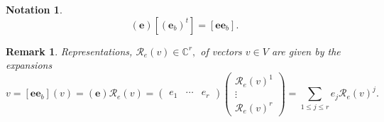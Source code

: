 \documentclass[aps,preprint]{revtex4}
\newtheorem{notation}[theorem]{Notation}
\newtheorem{remark}[theorem]{Remark}
\begin{document}
\begin{notation}
\begin{equation}
\left( \boldsymbol{e}\right) \left[ \left( \boldsymbol{e}_{b}\right) ^{t}%
\right] =\left[ \boldsymbol{ee}_{b}\right] .
\end{equation}
\end{notation}

\begin{remark}
Representations, $\mathcal{R}_{e}\left( v\right) \in \mathbb{C}^{r},$ of
vectors $v\in V$ are given by the expansions 
\begin{equation}
v=\left[ \boldsymbol{ee}_{b}\right] \left( v\right) =\left( \boldsymbol{e}%
\right) \mathcal{R}_{e}\left( v\right) =\left( 
\begin{array}{ccc}
e_{1} & \cdots & e_{r}%
\end{array}%
\right) \left( 
\begin{array}{c}
\mathcal{R}_{e}\left( v\right) ^{1} \\ 
\vdots \\ 
\mathcal{R}_{e}\left( v\right) ^{r}%
\end{array}%
\right) =\sum_{1\leq j\leq r}e_{j}\mathcal{R}_{e}\left( v\right) ^{j}.
\end{equation}
\end{remark}
\end{document}
